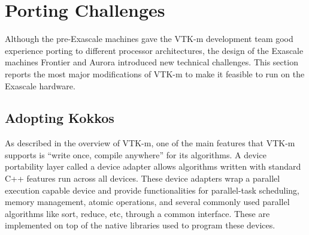 \section{Porting Challenges}

Although the pre-Exascale machines gave the VTK-m development team good experience porting to different processor architectures, the design of the Exascale machines Frontier and Aurora introduced new technical challenges.
This section reports the most major modifications of VTK-m to make it feasible to run on the Exascale hardware.


\subsection{Adopting Kokkos}
\label{sec:adopting-kokkos}


As described in the overview of VTK-m,
one of the main features that VTK-m supports is ``write once, compile anywhere'' for its algorithms.
A device portability layer called a device adapter allows algorithms written with standard C++ features run across all devices.
These device adapters wrap a parallel execution capable device and provide functionalities for parallel-task scheduling, memory management, atomic operations, and several commonly used parallel algorithms like sort, reduce, etc, through a common interface.
These are implemented on top of the native libraries used to program these devices.

